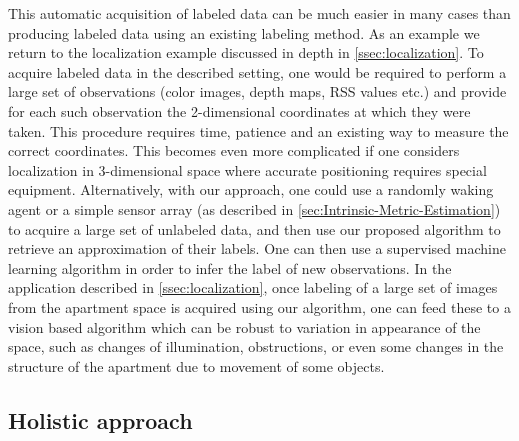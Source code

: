 	This automatic acquisition of labeled data can be much easier in many
	cases than producing labeled data using an existing labeling method.
	As an example we return to the localization example discussed in depth
	in \cref{ssec:localization}. To acquire labeled data in
	the described setting, one would be required to perform a large set
	of observations (color images, depth maps, \ac{RSS} values etc.)
	and provide for each such observation the 2-dimensional coordinates
	at which they were taken. This procedure requires time, patience and
	an existing way to measure the correct coordinates. This becomes even
	more complicated if one considers localization in 3-dimensional space
	where accurate positioning requires special equipment. Alternatively,
	with our approach, one could use a randomly waking agent or a simple
	sensor array (as described in \cref{sec:Intrinsic-Metric-Estimation})
	to acquire a large set of unlabeled data, and then use our proposed
	algorithm to retrieve an approximation of their labels. One can then
	use a supervised machine learning algorithm in order to infer the
	label of new observations. In the application described in \cref{ssec:localization}, once labeling of a large set of images
	from the apartment space is acquired using our algorithm, one can
	feed these to a vision based algorithm which can be robust to variation
	in appearance of the space, such as changes of illumination, obstructions,
	or even some changes in the structure of the apartment due to movement
	of some objects.
	
	\subsection{Holistic approach}
	

